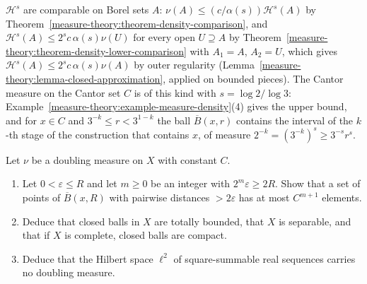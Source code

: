 \begin{remark}
\begin{enumerate}
$\mathcal{H}^s$ are comparable on Borel sets $A$: $\nu(A) \leq (c/\alpha(s))\mathcal{H}^s(A)$ by Theorem~\ref{measure-theory:theorem-density-comparison}, and
$\mathcal{H}^s(A) \leq 2^sc\,\alpha(s)\nu(U)$ for every open $U \supseteq A$ by Theorem~\ref{measure-theory:theorem-density-lower-comparison} with $A_1 = A$, $A_2 = U$, which gives
$\mathcal{H}^s(A) \leq 2^sc\,\alpha(s)\nu(A)$ by outer regularity (Lemma~\ref{measure-theory:lemma-closed-approximation}, applied on bounded pieces). The Cantor measure on the Cantor set $C$ is of this
kind with $s = \log 2/\log 3$: Example~\ref{measure-theory:example-measure-density}(4) gives the upper bound, and for $x \in C$ and $3^{-k} \leq r < 3^{1-k}$ the ball $\overline{B}(x, r)$ contains the
interval of the $k$-th stage of the construction that contains $x$, of measure $2^{-k} = (3^{-k})^s \geq 3^{-s}r^s$.
\end{enumerate}
\end{remark}

\begin{exercise}\label{measure-theory:exercise-doubling-totally-bounded}
Let $\nu$ be a doubling measure on $X$ with constant $C$.
\begin{enumerate}
\item Let $0 < \varepsilon \leq R$ and let $m \geq 0$ be an integer with $2^m\varepsilon \geq 2R$. Show that a set of points of $\overline{B}(x, R)$ with pairwise distances $> 2\varepsilon$ has at most $C^{m+1}$
elements.
\item Deduce that closed balls in $X$ are totally bounded, that $X$ is separable, and that if $X$ is complete, closed balls are compact.
\item Deduce that the Hilbert space $\ell^2$ of square-summable real sequences carries no doubling measure.
\end{enumerate}
\end{exercise}

